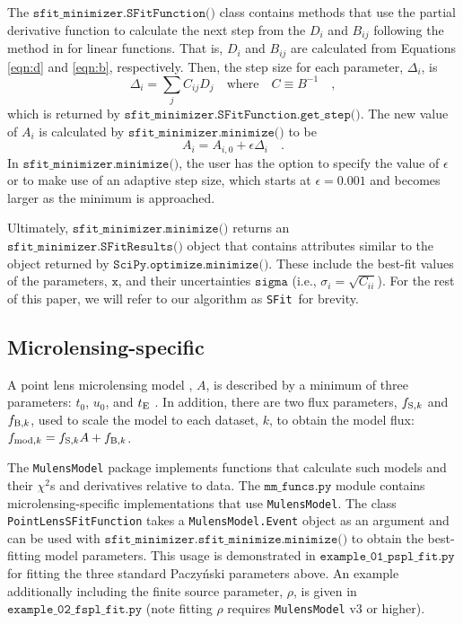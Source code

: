 \documentclass[preprint]{aastex631}
\newcommand{\minimize}{$\texttt{SciPy.optimize.minimize()}$}
\newcommand{\sfit}{\texttt{SFit}}
\begin{document}
The $\texttt{sfit\_minimizer.SFitFunction()}$ class contains methods that use the partial derivative function to calculate the next step from the $D_i$ and $B_{ij}$ following the method in \citet{Gould03} for linear functions. That is, $D_i$ and $B_{ij}$ are calculated from Equations \ref{eqn:d} and \ref{eqn:b}, respectively. Then, the step size for each parameter, $\Delta_i$, is
\begin{equation}
\Delta_i = \sum_j C_{ij} D_j \quad \mathrm{where} \quad C \equiv B^{-1} \quad,
\end{equation}
which is returned by $\texttt{sfit\_minimizer.SFitFunction.get\_step()}$.
The new value of $A_i$ is calculated by $\texttt{sfit\_minimizer.minimize()}$ to be
\begin{equation}
A_i = A_{i, 0} + \epsilon \Delta_i \quad . 
\end{equation}
In  $\texttt{sfit\_minimizer.minimize()}$, the user has the option to specify the value of $\epsilon$ or to make use of an adaptive step size, which starts at $\epsilon = 0.001$ and becomes larger as the minimum is approached.

Ultimately, $\texttt{sfit\_minimizer.minimize()}$ returns an $\texttt{sfit\_minimizer.SFitResults()}$ object that contains attributes similar to the object returned by \minimize. These include the best-fit values of the parameters, $\texttt{x}$, and their uncertainties $\texttt{sigma}$ (i.e., $\sigma_i = \sqrt{C_{ii}}$). For the rest of this paper, we will refer to our algorithm as \sfit\, for brevity.

\subsection{Microlensing-specific}

A point lens microlensing model \citep{Paczynski86b}, $A$, is described by a minimum of three parameters: $t_0$, $u_0$, and $t_{\rm E}$ \citep[for the definitions of these parameters see, e.g.,][]{Gaudi12}. In addition, there are two flux parameters, $f_{{\rm S}, k}$ and $f_{{\rm B}, k}$, used to scale the model to each dataset, $k$, to obtain the model flux: $f_{{\rm mod}, k} = f_{{\rm S}, k} A + f_{{\rm B}, k}$. 

The \texttt{MulensModel} package \citep{MulensModel} implements functions that calculate such models and their $\chi^2$s and derivatives relative to data. The $\texttt{mm\_funcs.py}$ module contains microlensing-specific implementations that use \texttt{MulensModel}. The class \texttt{PointLensSFitFunction} takes a  \texttt{MulensModel.Event} object as an argument and can be used with $\texttt{sfit\_minimizer.sfit\_minimize.minimize()}$ to obtain the best-fitting model parameters. This usage is demonstrated in $\texttt{example\_01\_pspl\_fit.py}$ for fitting the three standard Paczy\'{n}ski parameters above. An example additionally including the finite source parameter, $\rho$, is given in $\texttt{example\_02\_fspl\_fit.py}$ (note fitting $\rho$ requires \texttt{MulensModel} v3 or higher).
\end{document}
